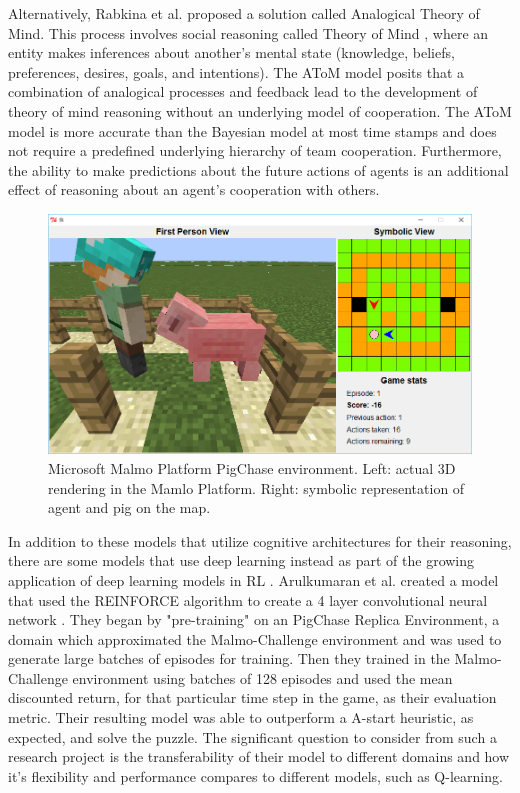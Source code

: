 \documentclass[10pt,twocolumn]{article}
\begin{document}
Alternatively, Rabkina et al. proposed a solution called Analogical Theory of Mind.
This process involves social reasoning called Theory of Mind \cite{Ruhl2020}, where an entity makes inferences about another’s mental state (knowledge, beliefs, preferences, desires, goals, and intentions).
The AToM model posits that a combination of analogical processes and feedback lead to the development of theory of mind reasoning without an underlying model of cooperation.
The AToM model is more accurate than the Bayesian model at most time stamps and does not require a predefined underlying hierarchy of team cooperation.
Furthermore, the ability to make predictions about the future actions of agents is an additional effect of reasoning about an agent’s cooperation with others.

\begin{figure}[ht]
\centering
\includegraphics[width=0.75\linewidth]{Assets/pig-chase-overview.png}
\vspace{0.5cm}
\caption{Microsoft Malmo Platform PigChase environment. Left: actual 3D rendering in the Mamlo Platform. Right: symbolic representation of agent and pig on the map.}
\label{Figure:2}
\end{figure}

In addition to these models that utilize cognitive architectures for their reasoning, there are some models that use deep learning instead as part of the growing application of deep learning models in RL \cite{Nica2017}.
Arulkumaran et al. created a model that used the REINFORCE algorithm to create a 4 layer convolutional neural network \cite{Arulkumaran2017, Williams1992}.
They began by "pre-training" on an PigChase Replica Environment, a domain which approximated the Malmo-Challenge environment and was used to generate large batches of episodes for training.
Then they trained in the Malmo-Challenge environment using batches of 128 episodes and used the mean discounted return, for that particular time step in the game, as their evaluation metric.
Their resulting model was able to outperform a A-start heuristic, as expected, and solve the puzzle.
The significant question to consider from such a research project is the transferability of their model to different domains and how it's flexibility and performance compares to different models, such as Q-learning.
\end{document}
